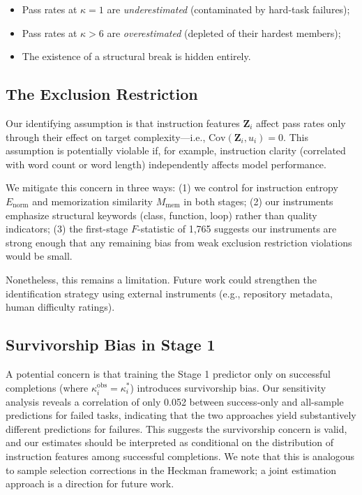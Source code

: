 \documentclass[conference]{IEEEtran}
\begin{document}
\begin{itemize}
    \item Pass rates at $\kappa = 1$ are \emph{underestimated} (contaminated by hard-task failures);
    \item Pass rates at $\kappa > 6$ are \emph{overestimated} (depleted of their hardest members);
    \item The existence of a structural break is hidden entirely.
\end{itemize}

\subsection{The Exclusion Restriction}

Our identifying assumption is that instruction features $\mathbf{Z}_i$ affect pass rates only through their effect on target complexity---i.e., $\text{Cov}(\mathbf{Z}_i, u_i) = 0$. This assumption is potentially violable if, for example, instruction clarity (correlated with word count or word length) independently affects model performance.

We mitigate this concern in three ways: (1) we control for instruction entropy $E_{\text{norm}}$ and memorization similarity $M_{\text{mem}}$ in both stages; (2) our instruments emphasize structural keywords (class, function, loop) rather than quality indicators; (3) the first-stage $F$-statistic of 1,765 suggests our instruments are strong enough that any remaining bias from weak exclusion restriction violations would be small.

Nonetheless, this remains a limitation. Future work could strengthen the identification strategy using external instruments (e.g., repository metadata, human difficulty ratings).

\subsection{Survivorship Bias in Stage 1}

A potential concern is that training the Stage 1 predictor only on successful completions (where $\kappa_i^{\text{obs}} = \kappa_i^*$) introduces survivorship bias. Our sensitivity analysis reveals a correlation of only 0.052 between success-only and all-sample predictions for failed tasks, indicating that the two approaches yield substantively different predictions for failures. This suggests the survivorship concern is valid, and our estimates should be interpreted as conditional on the distribution of instruction features among successful completions. We note that this is analogous to sample selection corrections in the Heckman framework; a joint estimation approach is a direction for future work.
\end{document}

